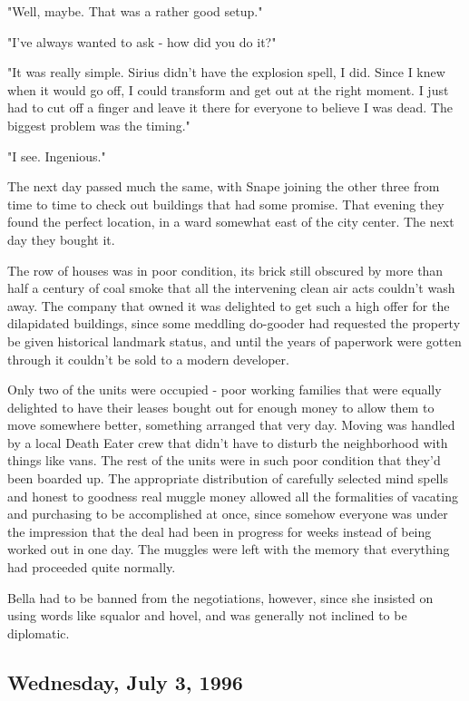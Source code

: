 "Well, maybe. That was a rather good setup."

"I've always wanted to ask - how did you do it?"

"It was really simple. Sirius didn't have the explosion spell, I did. Since I knew when it would go off, I could transform and get out at the right moment. I just had to cut off a finger and leave it there for everyone to believe I was dead. The biggest problem was the timing."

"I see. Ingenious."

The next day passed much the same, with Snape joining the other three from time to time to check out buildings that had some promise. That evening they found the perfect location, in a ward somewhat east of the city center. The next day they bought it.

The row of houses was in poor condition, its brick still obscured by more than half a century of coal smoke that all the intervening clean air acts couldn't wash away. The company that owned it was delighted to get such a high offer for the dilapidated buildings, since some meddling do-gooder had requested the property be given historical landmark status, and until the years of paperwork were gotten through it couldn't be sold to a modern developer.

Only two of the units were occupied - poor working families that were equally delighted to have their leases bought out for enough money to allow them to move somewhere better, something arranged that very day. Moving was handled by a local Death Eater crew that didn't have to disturb the neighborhood with things like vans. The rest of the units were in such poor condition that they'd been boarded up. The appropriate distribution of carefully selected mind spells and honest to goodness real muggle money allowed all the formalities of vacating and purchasing to be accomplished at once, since somehow everyone was under the impression that the deal had been in progress for weeks instead of being worked out in one day. The muggles were left with the memory that everything had proceeded quite normally.

Bella had to be banned from the negotiations, however, since she insisted on using words like squalor and hovel, and was generally not inclined to be diplomatic.

\subsection{Wednesday, July 3, 1996}

